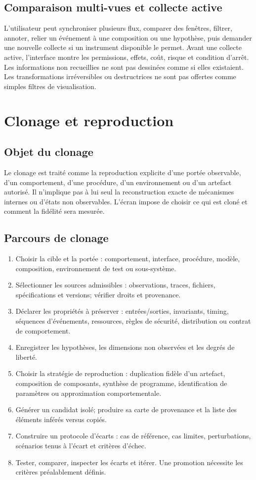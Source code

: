 \documentclass[11pt,a4paper]{article}
\begin{document}
\subsection{Comparaison multi-vues et collecte active}
L'utilisateur peut synchroniser plusieurs flux, comparer des fenêtres, filtrer, annoter, relier un événement à une composition ou une hypothèse, puis demander une nouvelle collecte si un instrument disponible le permet. Avant une collecte active, l'interface montre les permissions, effets, coût, risque et condition d'arrêt. Les informations non recueillies ne sont pas dessinées comme si elles existaient. Les transformations irréversibles ou destructrices ne sont pas offertes comme simples filtres de visualisation.

\section{Clonage et reproduction}
\subsection{Objet du clonage}
Le clonage est traité comme la reproduction explicite d'une portée observable, d'un comportement, d'une procédure, d'un environnement ou d'un artefact autorisé. Il n'implique pas à lui seul la reconstruction exacte de mécanismes internes ou d'états non observables. L'écran impose de choisir ce qui est cloné et comment la fidélité sera mesurée.

\subsection{Parcours de clonage}
\begin{enumerate}
\item Choisir la cible et la portée : comportement, interface, procédure, modèle, composition, environnement de test ou sous-système.
\item Sélectionner les sources admissibles : observations, traces, fichiers, spécifications et versions; vérifier droits et provenance.
\item Déclarer les propriétés à préserver : entrées/sorties, invariants, timing, séquences d'événements, ressources, règles de sécurité, distribution ou contrat de comportement.
\item Enregistrer les hypothèses, les dimensions non observées et les degrés de liberté.
\item Choisir la stratégie de reproduction : duplication fidèle d'un artefact, composition de composants, synthèse de programme, identification de paramètres ou approximation comportementale.
\item Générer un candidat isolé; produire sa carte de provenance et la liste des éléments inférés versus copiés.
\item Construire un protocole d'écarts : cas de référence, cas limites, perturbations, scénarios tenus à l'écart et critères d'échec.
\item Tester, comparer, inspecter les écarts et itérer. Une promotion nécessite les critères préalablement définis.
\end{enumerate}
\end{document}
